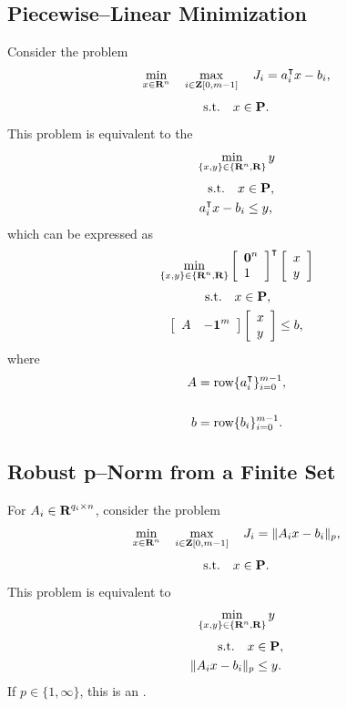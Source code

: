 \documentclass{article}
\begin{document}
    \clearpage
    \subsection{Piecewise--Linear Minimization}
        Consider the problem
        \begin{align*}
            \min_{x\in\textbf{R}^n}\quad \max_{i\in\textbf{Z}[0,m-1]} \quad J_i = a_i^\intercal x-b_i,
        \end{align*}
        \begin{align*}
            \text{s.t.}\quad x\in\textbf{P}.
        \end{align*}
        This problem is equivalent to the \LP \cite[p.~150]{bv_cvxbook}
        \begin{align*}
            \min_{\{x,y\}\in\{\textbf{R}^n,\textbf{R}\}} y
        \end{align*}
        \begin{align*}
            \text{s.t.}\quad x&\in\textbf{P},\\
            a_i^\intercal x-b_i &\leq y,
        \end{align*}
        which can be expressed as
        \begin{align*}
            \min_{\{x,y\}\in\{\textbf{R}^n,\textbf{R}\}} \left[\begin{array}{lllllllllllllllllll}\textbf{0}^n \\ 1\end{array}\right]^\intercal \left[\begin{array}{lllllllllllllllllll}x\\y\end{array}\right]
        \end{align*}
        \begin{align*}
            \text{s.t.}\quad x&\in\textbf{P},\\
            \left[\begin{array}{lllllllllllllllllll}A&-\textbf{1}^m\end{array}\right]&\left[\begin{array}{lllllllllllllllllll}x\\y\end{array}\right]\leq b,
        \end{align*}
        where
        \begin{align*}
            A &= \text{row}\{a_i^\intercal\}_{i=0}^{m-1},\\\\
            b &= \text{row}\{b_i\}_{i=0}^{m-1}.
        \end{align*}

\subsection{Robust p--Norm from a Finite Set}

        For $A_i\in\textbf{R}^{q_i\times n}$, consider the problem
        \begin{align*}
            \min_{x\in\textbf{R}^n}\quad \max_{i\in\textbf{Z}[0,m-1]} \quad J_i = \|A_ix-b_i\|_p,
        \end{align*}
        \begin{align*}
            \text{s.t.}\quad x\in\textbf{P}.
        \end{align*}
        This problem is equivalent to \cite[p.~321]{bv_cvxbook}
        \begin{align*}
            \min_{\{x,y\}\in\{\textbf{R}^n,\textbf{R}\}} y
        \end{align*}
        \begin{align}
            \text{s.t.}\quad x&\in\textbf{P},\nonumber\\
            \|A_ix-b_i\|_p&\leq y.\label{eqn:robust}
        \end{align}
        If $p\in\{1,\infty\}$, this is an \LP.
\end{document}
